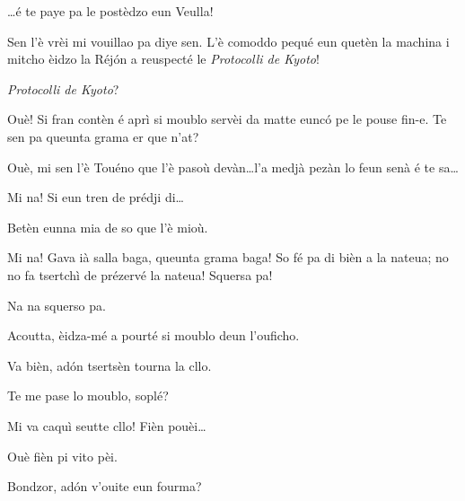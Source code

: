 \begin{drama}
\Sandrinospeaks \ldots é te paye pa le postèdzo eun Veulla!

\Richardspeaks Sen l'è vrèi mi vouillao pa diye sen. L'è comoddo pequé eun quetèn la machina i mitcho èidzo la Réj\'on a reuspecté le \textit{Protocolli de Kyoto}! 

\Sandrinospeaks \textit{Protocolli de Kyoto}?

\Sandrinospeaks Ouè! Si fran contèn é aprì si moublo servèi da matte eunc\'o pe le pouse fin-e. Te sen pa  queunta grama er que n'at? 

\Sandrinospeaks Ouè, mi sen l'è Touéno que l'è pasoù devàn\ldots l'a medjà pezàn lo feun senà é te sa\ldots

\Richardspeaks Mi na! Si eun tren de prédji di\ldots


\Sandrinospeaks Betèn eunna mia de so que l'è mioù.

\Richardspeaks Mi na! Gava ià salla baga, queunta grama baga! So fé pa di bièn a la nateua; no no fa tsertchì de prézervé la nateua! Squersa pa!

\Sandrinospeaks Na na squerso pa.

\Richardspeaks Acoutta, èidza-mé a pourté si moublo deun l'ouficho.

\Sandrinospeaks Va bièn, ad\'on tsertsèn tourna la cllo.


\Richardspeaks Te me pase lo moublo, soplé?


\Sandrinospeaks{} Mi va caquì seutte cllo! Fièn pouèi\ldots


\Richardspeaks Ouè fièn pi vito pèi.



\Richardspeaks{} Bondzor, ad\'on v'ouite eun fourma?


\end{drama}
